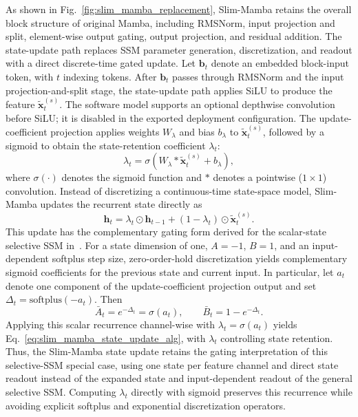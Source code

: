 \documentclass[lettersize,journal]{IEEEtran}
\begin{document}
As shown in Fig.~\ref{fig:slim_mamba_replacement}, Slim-Mamba retains the
overall block structure of original Mamba,
including RMSNorm, input projection and split, element-wise output gating,
output projection, and residual addition. The state-update path replaces
SSM parameter generation, discretization, and readout with a direct
discrete-time gated update. Let $\mathbf{b}_t$ denote an embedded block-input
token, with $t$ indexing tokens. After
\(\mathbf{b}_t\) passes through RMSNorm and the input projection-and-split
stage, the state-update path applies SiLU to produce
the feature \(\tilde{\mathbf{x}}^{(s)}_t\). The software model supports an
optional depthwise convolution before SiLU; it is disabled in the exported
deployment configuration. The update-coefficient projection applies weights
$W_{\lambda}$ and bias $b_{\lambda}$ to $\tilde{\mathbf{x}}^{(s)}_t$,
followed by a sigmoid to obtain the state-retention coefficient $\lambda_t$:
\begin{equation}
\lambda_t = \sigma \!\left(W_{\lambda} * \tilde{\mathbf{x}}^{(s)}_t + b_{\lambda}\right),
\label{eq:slim_mamba_lambda}
\end{equation}
where \(\sigma(\cdot)\) denotes the sigmoid function and $*$ denotes a
pointwise ($1\times1$) convolution. Instead of discretizing a
continuous-time state-space model, Slim-Mamba updates the recurrent state
directly as
\begin{equation}
\mathbf{h}_t = \lambda_t \odot \mathbf{h}_{t-1}
 + (1-\lambda_t)\odot \tilde{\mathbf{x}}^{(s)}_t.
\label{eq:slim_mamba_state_update_alg}
\end{equation}
This update has the complementary gating form derived for the scalar-state
selective SSM in~\cite[Theorem~1]{Mamba2023}. For a state dimension of one,
$A=-1$, $B=1$, and an input-dependent softplus step size, zero-order-hold
discretization yields complementary sigmoid coefficients for the previous
state and current input. In particular, let $a_t$ denote one component of
the update-coefficient projection output and set
$\Delta_t=\mathrm{softplus}(-a_t)$. Then
\begin{equation}
\bar A_t=e^{-\Delta_t}=\sigma(a_t),\qquad
\bar B_t=1-e^{-\Delta_t}.
\label{eq:scalar_ssm_gate_relation}
\end{equation}
Applying this scalar recurrence channel-wise with $\lambda_t=\sigma(a_t)$
yields Eq.~\eqref{eq:slim_mamba_state_update_alg}, with $\lambda_t$ controlling
state retention. Thus, the Slim-Mamba state update retains the gating
interpretation of this selective-SSM special case, using one state per
feature channel and direct state readout instead of the expanded state and
input-dependent readout of the general selective SSM. Computing $\lambda_t$
directly with sigmoid preserves this recurrence while avoiding explicit
softplus and exponential discretization operators.
\end{document}
